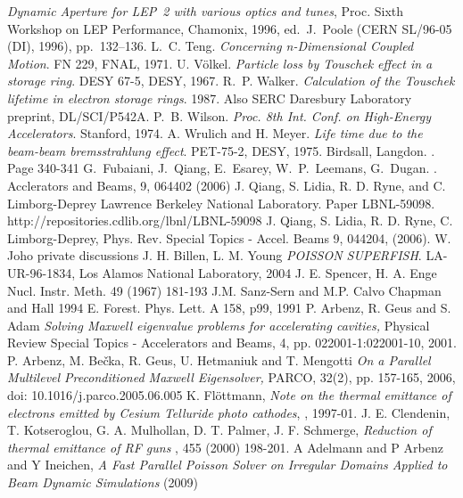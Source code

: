 \begin{thebibliography}{10}
{\sl Dynamic Aperture for LEP~2 with various optics and tunes}, 
Proc. Sixth Workshop on LEP Performance, Chamonix, 1996, ed.~J.~Poole (CERN SL/96-05 (DI), 1996), pp.~132--136.
L.~C. Teng.
{\sl Concerning n-Dimensional Coupled Motion}.
FN 229, FNAL, 1971.
U. V\"olkel.
{\sl Particle loss by Touschek effect in a storage ring}.
DESY 67-5, DESY, 1967.
R.~P. Walker.
{\sl Calculation of the Touschek lifetime in electron storage rings}.
1987.
Also SERC Daresbury Laboratory preprint, DL/SCI/P542A.
P.~B. Wilson.
{\sl Proc. 8th Int. Conf. on High-Energy Accelerators}.
Stanford, 1974.
A. Wrulich and H. Meyer.
{\sl Life time due to the beam-beam bremsstrahlung effect}.
PET-75-2, DESY, 1975.
Birdsall, Langdon.
.
\newblock Page 340-341
G.\ Fubaiani, J.\ Qiang, E.\ Esarey, W.\ P.\ Leemans, G.\ Dugan.
.
\newblock Acclerators and Beams, 9, 064402 (2006) 
J. Qiang, S. Lidia, R. D. Ryne, and C. Limborg-Deprey
\newblock Lawrence Berkeley National Laboratory. Paper LBNL-59098. http://repositories.cdlib.org/lbnl/LBNL-59098
J. Qiang, S. Lidia, R. D. Ryne, C. Limborg-Deprey, 
\newblock Phys. Rev. Special Topics - Accel. Beams 9, 044204, (2006).
W. Joho
\newblock private discussions
J. H. Billen, L. M. Young
{\sl POISSON SUPERFISH}.
LA-UR-96-1834, Los Alamos National Laboratory, 2004
J. E. Spencer,  H. A. Enge
\newblock Nucl. Instr. Meth. 49 (1967) 181-193
J.M. Sanz-Sern and M.P. Calvo
Chapman and Hall 1994
E. Forest. Phys. Lett. A 158, p99, 1991
P. Arbenz, R. Geus and S. Adam
{\sl Solving Maxwell eigenvalue problems for accelerating cavities,}
Physical Review Special Topics - Accelerators and Beams,
4, pp. 022001-1:022001-10, 2001.
P. Arbenz, M. Be\v{c}ka, R. Geus, U. Hetmaniuk and T. Mengotti
{\sl On a Parallel Multilevel Preconditioned Maxwell Eigensolver,}
PARCO, 32(2), pp. 157-165, 2006, doi: 10.1016/j.parco.2005.06.005
K. Fl\"ottmann,
{\sl Note on the thermal emittance of electrons emitted by Cesium Telluride photo cathodes},
, 1997-01.
J. E. Clendenin, T. Kotseroglou, G. A. Mulhollan, D. T. Palmer, J. F. Schmerge,
{\sl Reduction of thermal emittance of RF guns}
, 455 (2000) 198-201.
A Adelmann and P Arbenz and Y Ineichen, 
{\sl A Fast Parallel Poisson Solver on Irregular Domains Applied to Beam  Dynamic Simulations}
 (2009)

 
\end{thebibliography}
